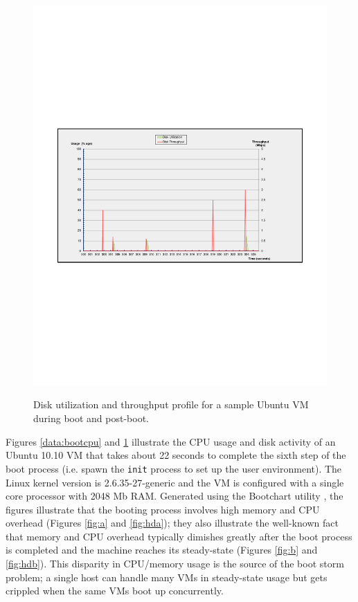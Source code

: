 \begin{figure}
           {\includegraphics[width=\textwidth, trim=2cm 8cm 2cm 8cm]{hd-ss.pdf} \label{fig:hdb}} 
  \caption[Disk utilization and throughput profile for a sample Ubuntu VM during boot and post-boot.]%
          {Disk utilization and throughput profile for a sample Ubuntu VM during boot and post-boot.}
  \label{data:boothd}
\end{figure}

\noindent Figures \ref{data:bootcpu} and \ref{data:boothd}
illustrate the CPU usage and disk activity 
of an Ubuntu 10.10 VM that takes about 22 seconds
to complete the sixth step of the boot process (i.e. spawn 
the \texttt{init} process to set up the user environment).
The Linux kernel version is 2.6.35-27-generic
and the VM is configured with a single core processor
with 2048 Mb RAM. Generated using
the Bootchart utility \cite{mahkovec2005bootchart},
the figures illustrate that
the booting process involves high memory
and CPU overhead (Figures \ref{fig:a} and \ref{fig:hda}); they also 
illustrate the well-known fact that memory and CPU
overhead typically dimishes greatly after the boot
process is completed and the machine reaches
its steady-state (Figures \ref{fig:b} and \ref{fig:hdb}). This disparity
in CPU/memory usage is the source of the boot storm problem;
a single host can handle many VMs in
steady-state usage but gets crippled
when the same VMs boot up concurrently.


